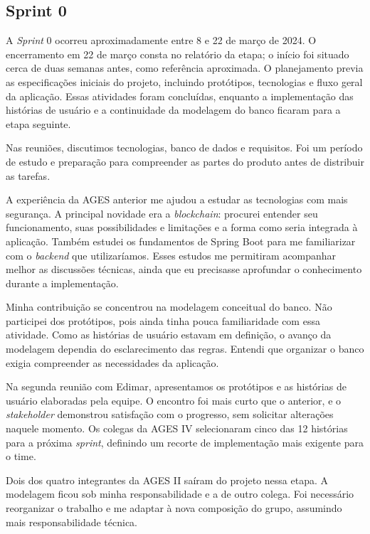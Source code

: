 \subsection{Sprint 0}

A \textit{Sprint} 0 ocorreu aproximadamente entre 8 e 22 de março de 2024. O encerramento em 22 de março consta no relatório da etapa; o início foi situado cerca de duas semanas antes, como referência aproximada. O planejamento previa as especificações iniciais do projeto, incluindo protótipos, tecnologias e fluxo geral da aplicação. Essas atividades foram concluídas, enquanto a implementação das histórias de usuário e a continuidade da modelagem do banco ficaram para a etapa seguinte.

Nas reuniões, discutimos tecnologias, banco de dados e requisitos. Foi um período de estudo e preparação para compreender as partes do produto antes de distribuir as tarefas.

A experiência da \ac{AGES} anterior me ajudou a estudar as tecnologias com mais segurança. A principal novidade era a \textit{blockchain}: procurei entender seu funcionamento, suas possibilidades e limitações e a forma como seria integrada à aplicação. Também estudei os fundamentos de Spring Boot para me familiarizar com o \textit{backend} que utilizaríamos. Esses estudos me permitiram acompanhar melhor as discussões técnicas, ainda que eu precisasse aprofundar o conhecimento durante a implementação.

Minha contribuição se concentrou na modelagem conceitual do banco. Não participei dos protótipos, pois ainda tinha pouca familiaridade com essa atividade. Como as histórias de usuário estavam em definição, o avanço da modelagem dependia do esclarecimento das regras. Entendi que organizar o banco exigia compreender as necessidades da aplicação.

Na segunda reunião com Edimar, apresentamos os protótipos e as histórias de usuário elaboradas pela equipe. O encontro foi mais curto que o anterior, e o \textit{stakeholder} demonstrou satisfação com o progresso, sem solicitar alterações naquele momento. Os colegas da \ac{AGES} IV selecionaram cinco das 12 histórias para a próxima \textit{sprint}, definindo um recorte de implementação mais exigente para o time.

Dois dos quatro integrantes da \ac{AGES} II saíram do projeto nessa etapa. A modelagem ficou sob minha responsabilidade e a de outro colega. Foi necessário reorganizar o trabalho e me adaptar à nova composição do grupo, assumindo mais responsabilidade técnica.

